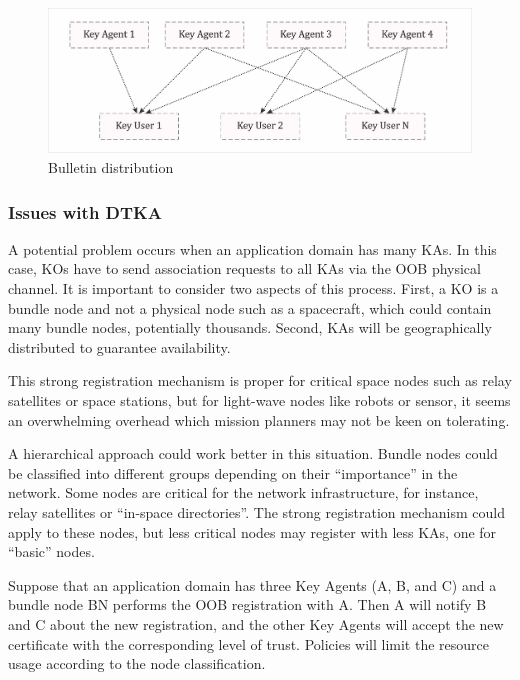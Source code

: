 \begin{figure}[hb]
\centering
\includegraphics[width=1 \linewidth]{images/distribution.png} 
\caption{Bulletin distribution}
\label{fig:distribution}
\end{figure}

\subsubsection{Issues with DTKA }


A potential problem occurs when an application domain has many KAs. In this case, KOs have to send association requests to all KAs via the OOB physical channel. It is important to consider two aspects of this process. First, a KO is a bundle node and not a physical node such as a spacecraft, which could contain many bundle nodes, potentially thousands. Second, KAs will be geographically distributed to guarantee availability.

This strong registration mechanism is proper for critical space nodes such as relay satellites or space stations, but for light-wave nodes like robots or sensor, it seems an overwhelming overhead which mission planners may not be keen on tolerating. 

A hierarchical approach could work better in this situation. Bundle nodes could be classified into different groups depending on their ``importance'' in the network. Some nodes are critical for the network infrastructure, for instance, relay satellites or ``in-space directories''. The strong registration mechanism could apply to these nodes, but less critical nodes may register with less KAs, one for ``basic'' nodes. 

Suppose that an application domain has three Key Agents (A, B, and C) and a bundle node BN performs the OOB registration with A. Then A will notify B and C about the new registration, and the other Key Agents will accept the new certificate with the corresponding level of trust. Policies will limit the resource usage according to the node classification. 

